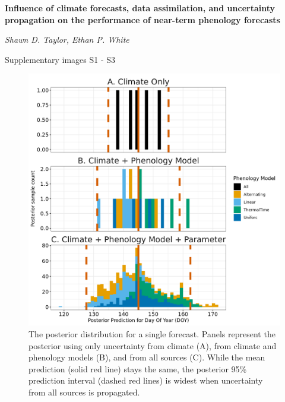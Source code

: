 \documentclass[a4paper,12pt]{article}
\begin{document}
\textbf{Influence of climate forecasts, data assimilation, and uncertainty propagation on the performance of near-term phenology forecasts }

\textit{Shawn D. Taylor, Ethan P. White}

Supplementary images S1 - S3


\newpage

\begin{figure}[ht]
\centering
\includegraphics[width=\linewidth]{figs/figS1_posterior_predictions_example.png}
\caption{The posterior distribution for a single forecast. Panels represent the posterior using only uncertainty from climate (A), from climate and phenology models (B), and from all sources (C). While the mean prediction (solid red line) stays the same, the posterior 95\% prediction interval (dashed red lines) is widest when uncertainty from all sources is propagated.}
\label{figS1}
\end{figure}

\newpage

\newpage
\end{document}
